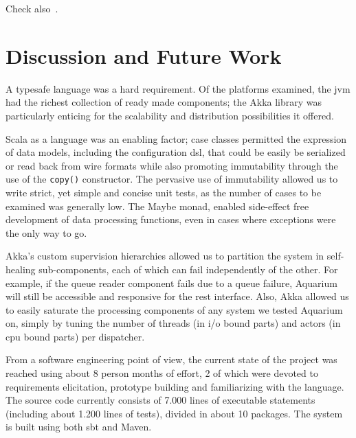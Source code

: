 \documentclass[letterpaper,twocolumn,10pt]{article}
\begin{document}
Check also~\cite{Ruiz-Agundez11}.

\section{Discussion and Future Work}

A typesafe language was a hard requirement. Of the platforms examined,
the {\sc jvm} had the richest collection of ready made components; the
Akka library was particularly enticing for the scalability and
distribution possibilities it offered.

Scala as a language was an enabling factor; case classes permitted the
expression of data models, including the configuration {\sc dsl}, that
could be easily be serialized or read back from wire formats while
also promoting immutability through the use of the \texttt{copy()}
constructor. The pervasive use of immutability allowed us to write
strict, yet simple and concise unit tests, as the number of cases to
be examined was generally low. The
\textsf{Maybe} monad, enabled side-effect
free development of data processing functions, even in cases where
exceptions were the only way to go. 

Akka's custom supervision hierarchies allowed us to partition the
system in self-healing sub-components, each of which can fail
independently of the other. For example, if the queue reader component
fails due to a queue failure, Aquarium will still be accessible and
responsive for the {\sc rest} interface. Also, Akka allowed us to
easily saturate the processing components of any system we tested
Aquarium on, simply by tuning the number of threads (in {\sc i/o}
bound parts) and actors (in {\sc cpu} bound parts) per dispatcher.

From a software engineering point of view, the current state of the project was
reached using about 8 person months of effort, 2 of which were devoted to
requirements elicitation, prototype building and familiarizing with the
language. The source code currently consists of 7.000 lines of executable
statements (including about 1.200 lines of tests), divided in about 10
packages. The system is built using both {\sc sbt} and Maven.
\end{document}
